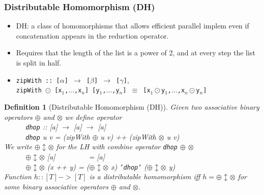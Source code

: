 \documentclass{beamer}
\newtheorem{mydef}{Definition}
\begin{document}
\begin{frame}[fragile,t]
  \frametitle{Distributable Homomorphism (DH)}

\begin{itemize}
    \item DH: a class of homomorphisms that allows efficient parallel
            implem even if concatenation appears in the reduction operator.
    \item Requires that the length of the list is a power of 2,
            and at every step the list is split in half.
    \item {\tt zipWith :: [$\alpha$] $\rightarrow$ [$\beta$] $\rightarrow$ [$\gamma$]},\\
          {\tt zipWith $\odot$ [x$_1$,$\ldots$,x$_n$] [y$_1$,$\ldots$,y$_n$] $\equiv$ [x$_1\odot$y$_1$,$\ldots$,x$_n\odot$y$_n$]}
\end{itemize}
\vspace{-1ex}
\begin{mydef}[Distributable Homomorphism (DH)]\label{DistribHom}
Given two associative binary operators $\oplus$ and $\otimes$ we define operator \\
$\mbox{ }\mbox{ }\mbox{ }\mbox{ }$ 
{\tt dhop} ::  %
                        [a] $\rightarrow$ [a] $\rightarrow$ [a] \\
$\mbox{ }\mbox{ }\mbox{ }\mbox{ }$ 
{\tt dhop}  u v = (zipWith $\oplus$ u v) ++ (zipWith $\otimes$ u v) \\  %
\vspace{1ex}
We write $\oplus\updownarrow\otimes$ for the LH with combine operator {\tt dhop} $\oplus$ $\otimes$\\
$\mbox{ }\mbox{ }\mbox{ }\mbox{ }$ 
$\oplus\updownarrow\otimes$ [a]   $\mbox{ }\mbox{ }\mbox{ }\mbox{ }\mbox{ }\mbox{ }$    = [a] \\
$\mbox{ }\mbox{ }\mbox{ }\mbox{ }$ 
$\oplus\updownarrow\otimes$ (x ++ y) = ($\oplus\updownarrow\otimes$ x) {\tt `dhop`} ($\oplus\updownarrow\otimes$ y) \\
\vspace{1ex}
Function $h :: [T] -> [T]$ is a distributable homomorphism iff $h = \oplus\updownarrow\otimes$ for some binary associative
operators  $\oplus$ and $\otimes$.
\end{mydef}

\end{frame}
\end{document}
